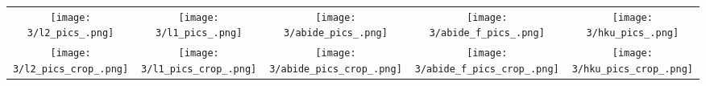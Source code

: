 \begin{tabular}{c @{\hskip 0pt} c @{\hskip 0pt} c @{\hskip 0pt} c @{\hskip 0pt} c}
    \texttt{[image: 3/l2\_pics\_.png]}&
    \texttt{[image: 3/l1\_pics\_.png]}&
    \texttt{[image: 3/abide\_pics\_.png]}&
    \texttt{[image: 3/abide\_f\_pics\_.png]}&
    \texttt{[image: 3/hku\_pics\_.png]}\\
    \texttt{[image: 3/l2\_pics\_crop\_.png]}&
    \texttt{[image: 3/l1\_pics\_crop\_.png]}&
    \texttt{[image: 3/abide\_pics\_crop\_.png]}&
    \texttt{[image: 3/abide\_f\_pics\_crop\_.png]}&
    \texttt{[image: 3/hku\_pics\_crop\_.png]}
\end{tabular}